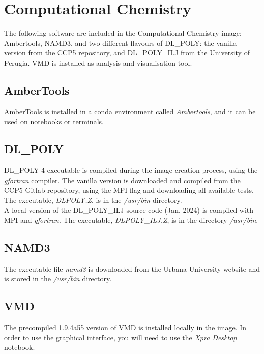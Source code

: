 

\section{Computational Chemistry}

The following software are included in the Computational Chemistry image:  Ambertools, NAMD3\cite{20PhHaMa}, and two different flavours of DL\_POLY\cite{DLPOLY}: the vanilla version from the CCP5 repository\cite{CCP5}, and DL\_POLY\_ILJ from the University of Perugia. VMD\cite{VMD} is installed as analysis and visualisation tool. \\

\subsection{AmberTools}
AmberTools is installed in a conda environment called \textit{Ambertools}, and it can be used on notebooks or terminals. 

\subsection{DL\_POLY}
DL\_POLY 4 executable is compiled during the image creation process, using the \textit{gfortran} compiler.
The vanilla version is downloaded and compiled from the CCP5\cite{CCP5} Gitlab repository, using the MPI flag and downloading all available tests. The executable, \textit{DLPOLY.Z}, is in the \textit{/usr/bin} directory. \\

A local version of the  DL\_POLY\_ILJ source code (Jan. 2024) is compiled with MPI and \textit{gfortran}. The executable, \textit{DLPOLY\_ILJ.Z}, is in the directory \textit{/usr/bin}. \\

\subsection{NAMD3}
The executable file \textit{namd3} is downloaded from the Urbana University website\cite{NAMD} and is stored in the \textit{/usr/bin} directory.

\subsection{VMD}
The precompiled 1.9.4a55 version of  VMD is installed locally in the image.\cite{VMD,96HuDaSc,98Stxxxx} In order to use the graphical interface, you will need to use the \textit{Xpra Desktop} notebook.
